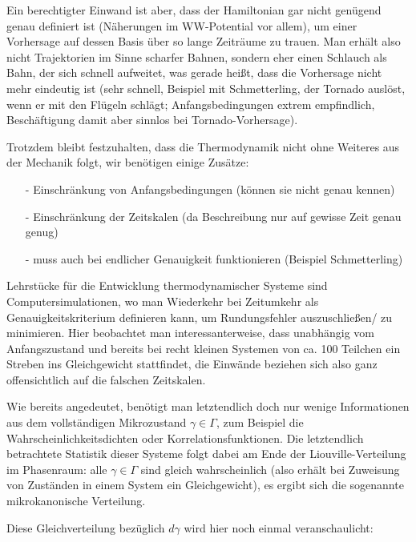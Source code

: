 \documentclass[../KlassMech_main.tex]{subfiles}
\begin{document}
Ein berechtigter Einwand ist aber, dass der Hamiltonian gar nicht genügend genau definiert ist (Näherungen im WW-Potential vor allem), um einer Vorhersage auf dessen Basis über so lange Zeiträume zu trauen. Man erhält also nicht Trajektorien im Sinne scharfer Bahnen, sondern eher einen Schlauch als Bahn, der sich schnell aufweitet, was gerade heißt, dass die Vorhersage nicht mehr eindeutig ist (sehr schnell, Beispiel mit Schmetterling, der Tornado auslöst, wenn er mit den Flügeln schlägt; Anfangsbedingungen extrem empfindlich, Beschäftigung damit aber sinnlos bei Tornado-Vorhersage).

Trotzdem bleibt festzuhalten, dass die Thermodynamik nicht ohne Weiteres aus der Mechanik folgt, wir benötigen einige Zusätze:
\begin{itemize}
\item[-] Einschränkung von Anfangsbedingungen (können sie nicht genau kennen)
\item[-] Einschränkung der Zeitskalen (da Beschreibung nur auf gewisse Zeit genau genug)
\item[-] muss auch bei endlicher Genauigkeit funktionieren (Beispiel Schmetterling)
\end{itemize}

Lehrstücke für die Entwicklung thermodynamischer Systeme sind Computersimulationen, wo man Wiederkehr bei Zeitumkehr als Genauigkeitskriterium definieren kann, um Rundungsfehler auszuschließen/ zu minimieren. Hier beobachtet man interessanterweise, dass unabhängig vom Anfangszustand und bereits bei recht kleinen Systemen von ca. 100 Teilchen ein Streben ins Gleichgewicht stattfindet, die Einwände beziehen sich also ganz offensichtlich auf die falschen Zeitskalen.

Wie bereits angedeutet, benötigt man letztendlich doch nur wenige Informationen aus dem vollständigen Mikrozustand $\gamma \in \Gamma$, zum Beispiel die Wahrscheinlichkeitsdichten oder Korrelationsfunktionen. Die letztendlich betrachtete Statistik dieser Systeme folgt dabei am Ende der Liouville-Verteilung im Phasenraum: alle $\gamma \in \Gamma$ sind gleich wahrscheinlich (also erhält bei Zuweisung von Zuständen in einem System ein Gleichgewicht), es ergibt sich die sogenannte mikrokanonische Verteilung.

Diese Gleichverteilung bezüglich $d\gamma$ wird hier noch einmal veranschaulicht:

\begin{center}
\label{fig:zeitentw}
\end{center}
\end{document}
